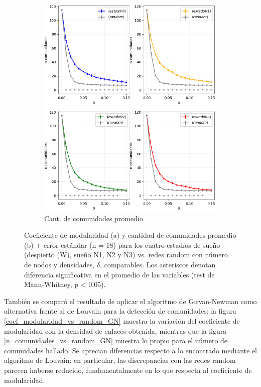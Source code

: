 \documentclass{article}
\begin{document}
\begin{figure} [!htb]
\begin{subfigure}[b]{0.43\textwidth}
		\includegraphics[width= \textwidth]{fg/curvas_comunidades_mann_whitney.png}
        \caption{Cant. de comunidades promedio}
        \label{fg_comunidades}
	\end{subfigure}
	\caption{Coeficiente de modularidad (a) y cantidad de comunidades promedio (b) $\pm$  error estándar (n = 18) para los cuatro estadíos de sueño (despierto (W), sueño N1, N2 y N3) vs. redes random con número de nodos y densidades, $\delta$, comparables. Los asteriscos denotan diferencia significativa en el promedio de las variables (test de Mann-Whitney, p < 0.05).}	
    \label{fg:modularidad2}
\end{figure}

También se comparó el resultado de aplicar el algoritmo de Girvan-Newman como alternativa frente al de Louvain para la detección de comunidades: la figura \ref{coef_modularidad_vs_random_GN} muestra la variación del coeficiente de modularidad con la densidad de enlaces obtenida, mientras que la figura \ref{n_comunidades_vs_random_GN} muestra lo propio para el número de comunidades hallado. Se aprecian diferencias respecto a lo encontrado mediante el algoritmo de Louvain: en particular, las discrepancias con las redes random parecen haberse reducido, fundamentalmente en lo que respecta al coeficiente de modularidad.
\end{document}
